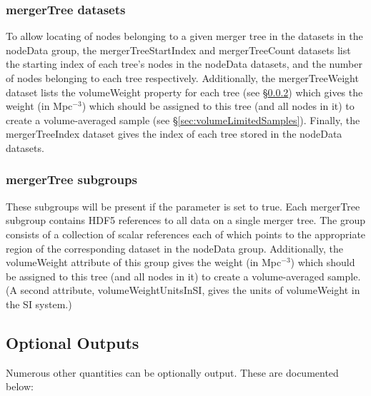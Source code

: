 \subsubsection{mergerTree datasets}\label{sec:mergerTreeDatasets}

To allow locating of nodes belonging to a given merger tree in the datasets in the {\normalfont \ttfamily nodeData} group, the {\normalfont \ttfamily mergerTreeStartIndex} and {\normalfont \ttfamily mergerTreeCount} datasets list the starting index of each tree's nodes in the {\normalfont \ttfamily nodeData} datasets, and the number of nodes belonging to each tree respectively. Additionally, the {\normalfont \ttfamily mergerTreeWeight} dataset lists the {\normalfont \ttfamily volumeWeight} property for each tree (see \S\ref{sec:mergerTreeSubgroups}) which gives the weight (in Mpc$^{-3}$) which should be assigned to this tree (and all nodes in it) to create a volume-averaged sample (see \S\ref{sec:volumeLimitedSamples}). Finally, the {\normalfont \ttfamily mergerTreeIndex} dataset gives the index of each tree stored in the {\normalfont \ttfamily nodeData} datasets.

\subsubsection{mergerTree subgroups}\label{sec:mergerTreeSubgroups}

These subgroups will be present if the {\normalfont \ttfamily [mergerTreeOutputReferences]} parameter is set to true. Each {\normalfont \ttfamily mergerTree} subgroup contains HDF5 references to all data on a single merger tree. The group consists of a collection of scalar references each of which points to the appropriate region of the corresponding dataset in the {\normalfont \ttfamily nodeData} group. Additionally, the {\normalfont \ttfamily volumeWeight} attribute of this group gives the weight (in Mpc$^{-3}$) which should be assigned to this tree (and all nodes in it) to create a volume-averaged sample. (A second attribute, {\normalfont \ttfamily volumeWeightUnitsInSI}, gives the units of {\normalfont \ttfamily volumeWeight} in the SI system.)

\subsection{Optional Outputs}

Numerous other quantities can be optionally output. These are documented below:

